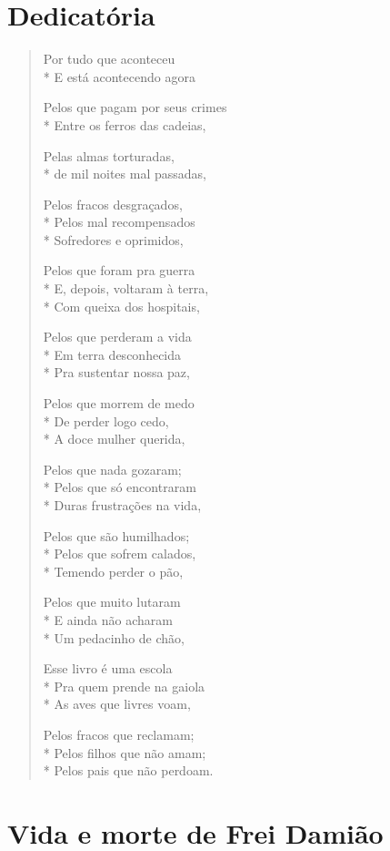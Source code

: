 \chapter{Dedicatória}

\begin{verse}
Por tudo que aconteceu\\*
E está acontecendo agora

Pelos que pagam por seus crimes\\*
Entre os ferros das cadeias,

Pelas almas torturadas,\\*
de mil noites mal passadas,

Pelos fracos desgraçados,\\*
Pelos mal recompensados\\*
Sofredores e oprimidos,

Pelos que foram pra guerra\\*
E, depois, voltaram à terra,\\*
Com queixa dos hospitais,

Pelos que perderam a vida\\*
Em terra desconhecida\\*
Pra sustentar nossa paz,

Pelos que morrem de medo\\*
De perder logo cedo,\\*
A doce mulher querida,

Pelos que nada gozaram;\\*
Pelos que só encontraram\\*
Duras frustrações na vida,

Pelos que são humilhados;\\*
Pelos que sofrem calados,\\*
Temendo perder o pão,

Pelos que muito lutaram\\*
E ainda não acharam\\*
Um pedacinho de chão,

Esse livro é uma escola\\*
Pra quem prende na gaiola\\*
As aves que livres voam,

Pelos fracos que reclamam;\\*
Pelos filhos que não amam;\\*
Pelos pais que não perdoam.
\end{verse}


\chapter{Vida e morte de Frei Damião}

